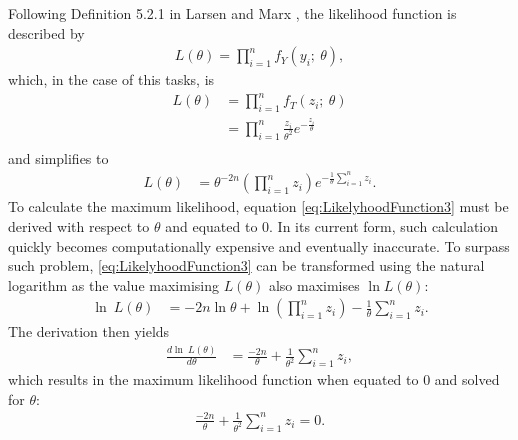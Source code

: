 Following Definition 5.2.1 in Larsen and Marx \cite{larsen2005introduction}, the likelihood function is described by
\begin{equation}
\begin{split}
L(\theta) = \prod_{i=1}^n f_Y(y_i;~\theta),
\end{split}
\label{eq:LikelyhoodFunctionDefinition}
\end{equation}
which, in the case of this tasks, is 
\begin{equation}
\begin{split}
L(\theta) 
&= \prod_{i=1}^n f_T(z_i;~\theta)\\
&= \prod_{i=1}^n \frac{z_i}{\theta^2} e^{-\frac{z_i}{\theta}}\\
\end{split}
\label{eq:LikelyhoodFunction2}
\end{equation}
and simplifies to 
\begin{equation}
\begin{split}
L(\theta) 
&= \theta^{-2n}\left(\prod_{i=1}^n z_i\right)e^{-\frac{1}{\theta}\sum_{i=1}^n z_i}.
\end{split}
\label{eq:LikelyhoodFunction3}
\end{equation}
To calculate the maximum likelihood, equation \eqref{eq:LikelyhoodFunction3} must be derived with respect to $\theta$ and equated to $0$. In its current form, such calculation quickly becomes computationally expensive and eventually inaccurate. To surpass such problem, \eqref{eq:LikelyhoodFunction3} can be transformed using the natural logarithm as the value maximising $L(\theta)$ also maximises $\ln L(\theta)$:
\begin{equation}
\begin{split}
\ln~L(\theta) 
&= -2n\ln\theta + \ln\left(\prod_{i=1}^n z_i\right)-\frac{1}{\theta}\sum_{i=1}^n z_i.
\end{split}
\label{eq:LikelyhoodFunction4}
\end{equation}
The derivation then yields
\begin{equation}
\begin{split}
\frac{d\ln~L(\theta)}{d\theta}
&= \frac{-2n}{\theta}+\frac{1}{\theta^2}\sum_{i=1}^n z_i,
\end{split}
\label{eq:LikelyhoodFunction5}
\end{equation}
which results in the maximum likelihood function when equated to $0$ and solved for $\theta$:
\begin{equation}
\begin{split}
\frac{-2n}{\theta}+\frac{1}{\theta^2}\sum_{i=1}^n z_i = 0.
\end{split}
\label{eq:LikelyhoodFunction6}
\end{equation}

